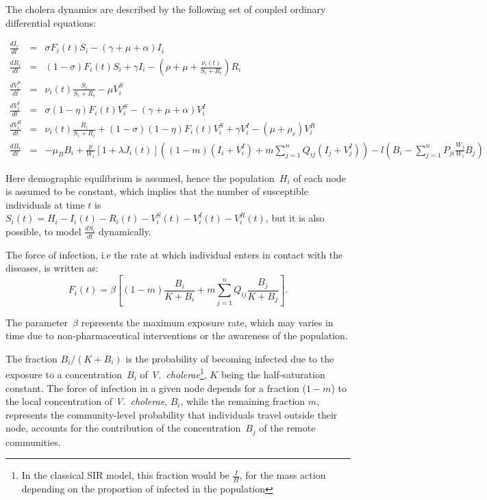 The cholera dynamics are described by the following set of coupled ordinary differential equations:
\begin{fullwidth}

\begingroup
\allowdisplaybreaks
\begin{eqnarray}
\frac{dI_i}{dt} &=& \sigma F_i(t) S_i - (\gamma + \mu + \alpha) I_i \label{eq:I2}\\
\frac{dR_i}{dt} &=& (1-\sigma) F_i(t) S_i + \gamma I_i - (\rho + \mu+\frac{\nu_i(t)}{S_i+R_i}) R_i \label{eq:R2}\\
\frac{dV^S_i}{dt} &=& \nu_i(t) \frac{S_i}{S_i+R_i}-\mu V^S_i \label{eq:VS2}\\
\frac{dV^I_i}{dt} &=& \sigma (1-\eta) F_i(t) V^S_i - (\gamma + \mu + \alpha) V^I_i \label{eq:VI2}\\
\frac{dV^R_i}{dt} &=& \nu_i(t) \frac{R_i}{S_i+R_i} + (1-\sigma) (1-\eta) F_i(t) V^S_i + \gamma V^I_i - (\mu+\rho_v) V^R_i \label{eq:VR2}\\
\frac{dB_i}{dt} &=& - \mu_B B_i +\frac{p}{W_i}\left[1 + \lambda J_i(t) \right] \left((1-m)(I_i +V_i^I)+m \sum_{j=1}^n Q_{ij} (I_j +V_j^I)\right)-  l \left( B_i - \sum_{j=1}^n P_{ji} \frac{W_j}{W_i} B_j \right)
\end{eqnarray}
\endgroup
\end{fullwidth}
Here demographic equilibrium is assumed, hence the population~$H_i$ of each node is assumed to be constant, which implies that the number of susceptible individuals at time $t$ is $S_i(t) = H_i - I_i(t) - R_i(t) - V_i^S(t) - V^I_i(t) - V_i^R(t)$, but it is also possible, to model $\frac{dS_i}{dt}$ dynamically.   

The force of infection, i.e the rate at which individual enters in contact with the diseases, is written as:
\begin{equation}
F_i(t) = \beta \left[ (1 - m) \frac{B_i}{K + B_i} + m \sum_{j=1}^n Q_{ij} \frac{B_j}{K + B_j} \right].
\label{force}
\end{equation}

The parameter~$\beta$ represents the maximum exposure rate, which may varies in time due to non-pharmaceutical interventions or the awareness of the population\cite{Bertuzzo:ProbabilityExtinctionHaiti:2016}.


 The fraction $B_{i}/(K+B_{i})$ is the probability of becoming infected due to the exposure to a concentration~$B_i$ of \textit{V.~cholerae}\footnote{In the classical SIR model, this fraction would be $\frac{I}{H}$, for the mass action depending on the proportion of infected in the population}, $K$ being the half-saturation constant\cite{Codeco:EndemicEpidemicDynamics:2001}. The force of infection in a given node depends for a fraction ($1-m$) to the local concentration of \textit{V.~cholerae}, $B_i$, while the remaining fraction $m$, represents the community-level probability that individuals travel outside their node, accounts for the contribution of the concentration~$B_j$ of the remote communities. 

